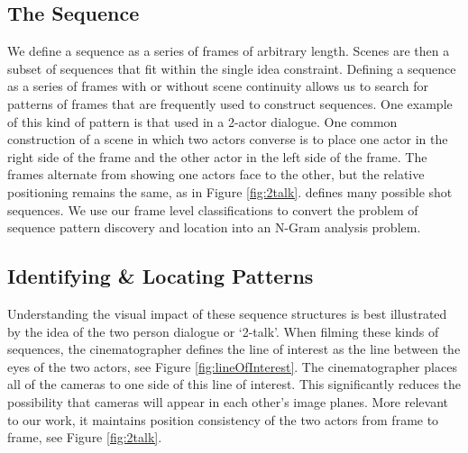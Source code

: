 \subsection*{The Sequence}
We define a sequence as a series of frames of arbitrary length. Scenes are then a subset of sequences that fit within the single idea constraint. Defining a sequence as a series of frames with or without scene continuity allows us to search for patterns of frames that are frequently used to construct sequences. One example of this kind of pattern is that used in a 2-actor dialogue. One common construction of a scene in which two actors converse is to place one actor in the right side of the frame and the other actor in the left side of the frame. The frames alternate from showing one actors face to the other, but the relative positioning remains the same, as in Figure \ref{fig:2talk}. \cite{arijon_grammar_1991} defines many possible shot sequences. We use our frame level classifications to convert the problem of sequence pattern discovery and location into an N-Gram analysis problem.


\subsection*{Identifying \& Locating Patterns}
Understanding the visual impact of these sequence structures is best illustrated by the idea of the two person dialogue or `2-talk'. When filming these kinds of sequences, the cinematographer defines the line of interest as the line between the eyes of the two actors, see Figure \ref{fig:lineOfInterest}. The cinematographer places all of the cameras to one side of this line of interest. This significantly reduces the possibility that cameras will appear in each other's image planes. More relevant to our work, it maintains position consistency of the two actors from frame to frame, see Figure \ref{fig:2talk}. 

